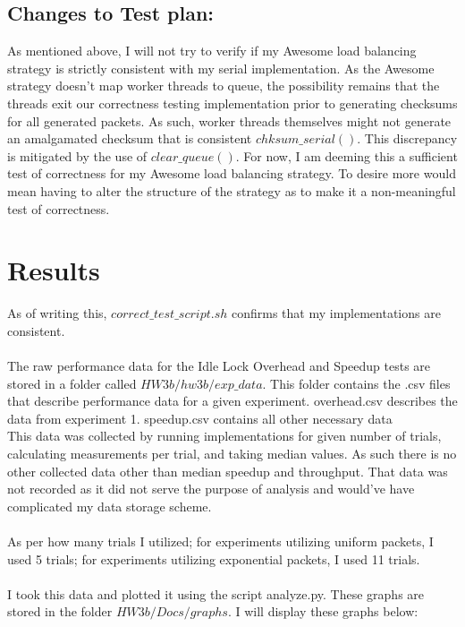 \documentclass[]{article}
\begin{document}
\subsection{Changes to Test plan:}
As mentioned above, I will not try to verify if my Awesome load balancing strategy is strictly consistent with my serial implementation. As the Awesome strategy doesn't map worker threads to queue, the possibility remains that the threads exit our correctness testing implementation prior to generating checksums for all generated packets. As such, worker threads themselves might not generate an amalgamated checksum that is consistent $chksum\_serial()$. This discrepancy is mitigated by the use of $clear\_queue()$. For now, I am deeming this a sufficient test of correctness for my Awesome load balancing strategy. To desire more would mean having to alter the structure of the strategy as to make it a non-meaningful test of correctness.
\section{Results}
As of writing this, $correct\_test\_script.sh$ confirms that my implementations are consistent.
\\\\
The raw performance data for the Idle Lock Overhead and Speedup tests are stored in a folder called $HW3b/hw3b/exp\_data$. This folder contains the .csv files that describe performance data for a given experiment. overhead.csv describes the data from experiment 1. speedup.csv contains all other necessary data
\\
This data was collected by running implementations for given number of trials, calculating measurements per trial, and taking median values. As such there is no other collected data other than median speedup and throughput. That data was not recorded as it did not serve the purpose of analysis and would've have complicated my data storage scheme.
\\\\
As per how many trials I utilized; for experiments utilizing uniform packets, I used 5 trials; for experiments utilizing exponential packets, I used 11 trials.
\\\\
I took this data and plotted it using the script analyze.py. These graphs are stored in the folder $HW3b/Docs/graphs$. I will display these graphs below:
\end{document}
